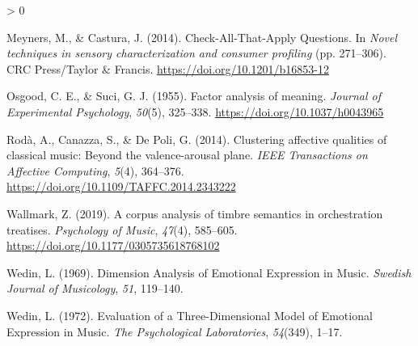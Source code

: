 \documentclass[
  english,
  man,floatsintext]{apa6}
\newlength{\cslhangindent}
\newenvironment{CSLReferences}[2] %
 {%
  \setlength{\parindent}{0pt}
  \ifodd #1 \everypar{\setlength{\hangindent}{\cslhangindent}}\ignorespaces\fi
  \ifnum #2 > 0
  \setlength{\parskip}{#2\baselineskip}
  \fi
 }%
 {}
\begin{document}
\begin{CSLReferences}{1}{0}
\leavevmode\hypertarget{ref-Meyners2014}{}%
Meyners, M., \& Castura, J. (2014). {Check-All-That-Apply Questions}. In \emph{Novel techniques in sensory characterization and consumer profiling} (pp. 271--306). CRC Press/Taylor {\&} Francis. \url{https://doi.org/10.1201/b16853-12}

\leavevmode\hypertarget{ref-Osgood1955}{}%
Osgood, C. E., \& Suci, G. J. (1955). {Factor analysis of meaning}. \emph{Journal of Experimental Psychology}, \emph{50}(5), 325--338. \url{https://doi.org/10.1037/h0043965}

\leavevmode\hypertarget{ref-Roda2014}{}%
Rodà, A., Canazza, S., \& De Poli, G. (2014). {Clustering affective qualities of classical music: Beyond the valence-arousal plane}. \emph{IEEE Transactions on Affective Computing}, \emph{5}(4), 364--376. \url{https://doi.org/10.1109/TAFFC.2014.2343222}

\leavevmode\hypertarget{ref-Wallmark2019}{}%
Wallmark, Z. (2019). {A corpus analysis of timbre semantics in orchestration treatises}. \emph{Psychology of Music}, \emph{47}(4), 585--605. \url{https://doi.org/10.1177/0305735618768102}

\leavevmode\hypertarget{ref-Wedin1969}{}%
Wedin, L. (1969). {Dimension Analysis of Emotional Expression in Music}. \emph{Swedish Journal of Musicology}, \emph{51}, 119--140.

\leavevmode\hypertarget{ref-Wedin1972}{}%
Wedin, L. (1972). {Evaluation of a Three-Dimensional Model of Emotional Expression in Music}. \emph{The Psychological Laboratories}, \emph{54}(349), 1--17.

\end{CSLReferences}

\endgroup
\end{document}
